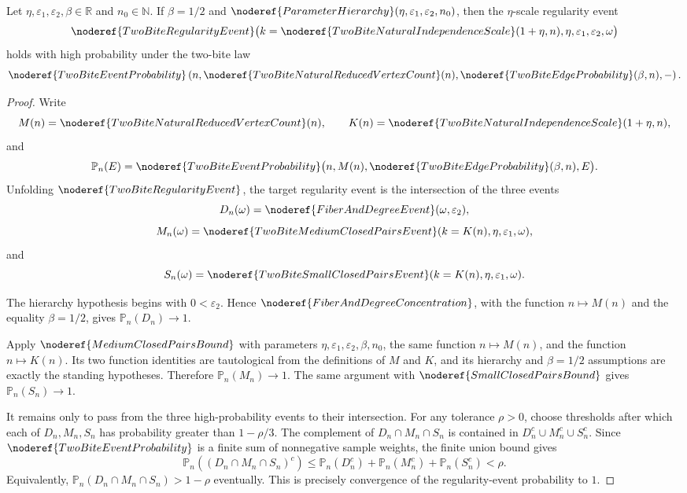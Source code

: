 \begin{helper}
Let \(\eta,\varepsilon_1,\varepsilon_2,\beta\in\mathbb R\) and
\(n_0\in\mathbb N\).  If \(\beta=1/2\) and
\(\noderef{ParameterHierarchy}(\eta,\varepsilon_1,\varepsilon_2,n_0)\), then
the \(\eta\)-scale regularity event
\[
\noderef{TwoBiteRegularityEvent}
\bigl(k=\noderef{TwoBiteNaturalIndependenceScale}(1+\eta,n),
\eta,\varepsilon_1,\varepsilon_2,\omega\bigr)
\]
holds with high probability under the two-bite law
\[
\noderef{TwoBiteEventProbability}
\left(n,\noderef{TwoBiteNaturalReducedVertexCount}(n),
\noderef{TwoBiteEdgeProbability}(\beta,n),-\right).
\]
\end{helper}
\begin{proof}
Write
\[
M(n)=\noderef{TwoBiteNaturalReducedVertexCount}(n),\qquad
K(n)=\noderef{TwoBiteNaturalIndependenceScale}(1+\eta,n),
\]
and
\[
\mathbb P_n(E)=
\noderef{TwoBiteEventProbability}
\bigl(n,M(n),\noderef{TwoBiteEdgeProbability}(\beta,n),E\bigr).
\]
Unfolding \(\noderef{TwoBiteRegularityEvent}\), the target regularity event is
the intersection of the three events
\[
D_n(\omega)=\noderef{FiberAndDegreeEvent}(\omega,\varepsilon_2),
\]
\[
M_n(\omega)=
\noderef{TwoBiteMediumClosedPairsEvent}(k=K(n),\eta,\varepsilon_1,\omega),
\]
and
\[
S_n(\omega)=
\noderef{TwoBiteSmallClosedPairsEvent}(k=K(n),\eta,\varepsilon_1,\omega).
\]

The hierarchy hypothesis begins with \(0<\varepsilon_2\).  Hence
\(\noderef{FiberAndDegreeConcentration}\), with the function
\(n\mapsto M(n)\) and the equality \(\beta=1/2\), gives
\(\mathbb P_n(D_n)\to1\).

Apply \(\noderef{MediumClosedPairsBound}\) with parameters
\(\eta,\varepsilon_1,\varepsilon_2,\beta,n_0\), the same function
\(n\mapsto M(n)\), and the function \(n\mapsto K(n)\).  Its two function
identities are tautological from the definitions of \(M\) and \(K\), and its
hierarchy and \(\beta=1/2\) assumptions are exactly the standing hypotheses.
Therefore \(\mathbb P_n(M_n)\to1\).  The same argument with
\(\noderef{SmallClosedPairsBound}\) gives \(\mathbb P_n(S_n)\to1\).

It remains only to pass from the three high-probability events to their
intersection.  For any tolerance \(\rho>0\), choose thresholds after which
each of \(D_n,M_n,S_n\) has probability greater than \(1-\rho/3\).  The
complement of \(D_n\cap M_n\cap S_n\) is contained in
\(D_n^c\cup M_n^c\cup S_n^c\).  Since
\(\noderef{TwoBiteEventProbability}\) is a finite sum of nonnegative sample
weights, the finite union bound gives
\[
\mathbb P_n((D_n\cap M_n\cap S_n)^c)
\le
\mathbb P_n(D_n^c)+\mathbb P_n(M_n^c)+\mathbb P_n(S_n^c)<\rho.
\]
Equivalently, \(\mathbb P_n(D_n\cap M_n\cap S_n)>1-\rho\) eventually.  This
is precisely convergence of the regularity-event probability to \(1\).
\end{proof}

